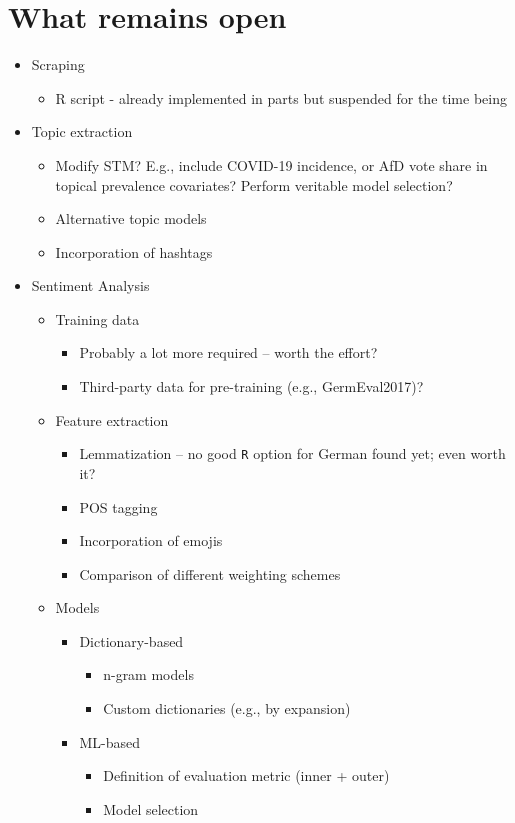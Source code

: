 \documentclass[12pt]{article}
\begin{document}
\newpage

\section*{What remains open}

\begin{itemize}
  \item Scraping
  \begin{itemize}
    \item R script - already implemented in parts but suspended for the time
    being
  \end{itemize}
  \item Topic extraction
  \begin{itemize}
    \item Modify STM? E.g., include COVID-19 incidence, or AfD vote share in 
    topical prevalence covariates? Perform veritable model selection?
    \item Alternative topic models
    \item Incorporation of hashtags
  \end{itemize}
  \item Sentiment Analysis
  \begin{itemize}
    \item Training data
    \begin{itemize}
      \item Probably a lot more required -- worth the effort?
      \item Third-party data for pre-training (e.g., GermEval2017)?
    \end{itemize}
    \item Feature extraction
    \begin{itemize}
      \item Lemmatization -- no good \texttt{R} option for German found yet;
      even worth it?
      \item POS tagging
      \item Incorporation of emojis
      \item Comparison of different weighting schemes
    \end{itemize}
    \item Models
    \begin{itemize}
      \item Dictionary-based
      \begin{itemize}
        \item n-gram models
        \item Custom dictionaries (e.g., by expansion)
      \end{itemize}
      \item ML-based
      \begin{itemize}
        \item Definition of evaluation metric (inner + outer)
        \item Model selection
      \end{itemize}
    \end{itemize}
  \end{itemize}
\end{itemize}
\end{document}
